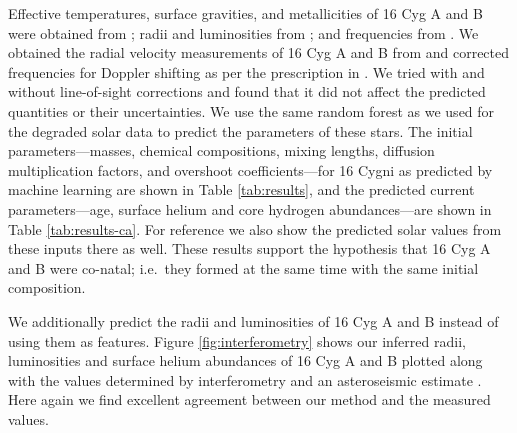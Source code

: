 \documentclass[twocolumn,twocolappendix]{aastex6}
\newif\ifref
\newcommand{\mb}[1]{\ifref\boldmath\textbf{#1}\unboldmath\else #1\fi}
\begin{document}
Effective temperatures, surface gravities, and metallicities of 16 Cyg A and B were obtained from \citet{2009A&A...508L..17R}; radii and luminosities from \citet{2013MNRAS.433.1262W}; and frequencies from \citet{2015MNRAS.446.2959D}. We obtained the radial velocity measurements of 16 Cyg A and B from \citet{2002ApJS..141..503N} and corrected frequencies for Doppler shifting as per the prescription in \citet{2014MNRAS.445L..94D}. We tried with and without line-of-sight corrections and found that it did not affect the predicted quantities or their uncertainties. We use the same random forest as we used for the degraded solar data to predict the \mb{parameters} of these stars. The initial parameters---masses, chemical compositions, mixing lengths, diffusion \mb{multiplication} factors, and overshoot coefficients---for 16 Cygni as predicted by machine learning \mb{are shown} in Table \ref{tab:results}, and the predicted current parameters---age, surface helium and core hydrogen abundances---\mb{are shown} in Table \ref{tab:results-ca}. For reference we also show the predicted solar values from these inputs there as well. These results support the hypothesis that 16 Cyg A and B were co-natal; i.e.\ they formed at the same time with the same initial composition. 

We additionally predict the radii and luminosities of 16 Cyg A and B instead of using them as \mb{features}. Figure \ref{fig:interferometry} shows our inferred radii, luminosities and surface helium abundances of 16 Cyg A and B plotted \mb{along with} the values determined by interferometry \citep{2013MNRAS.433.1262W} and an asteroseismic estimate \citep{2014ApJ...790..138V}. Here again we find excellent agreement between our method and the measured values. 
\end{document}
